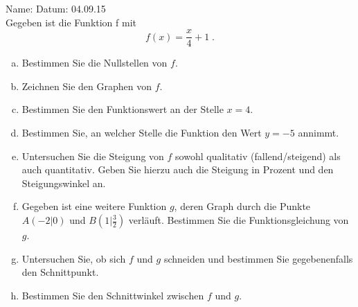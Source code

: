 \documentclass[12pt,fleqn]{article}
\theoremstyle{aufg}
\theoremstyle{bsp}
\begin{document}
 
    \begin{flushleft}
Name: \hspace{12cm} Datum: 04.09.15 \\[2em]Gegeben ist die Funktion f mit\[f(x)=\frac{x}{4} + 1\; . \]\begin{enumerate}[a)] 
\item 
Bestimmen Sie die Nullstellen von $f$. \\ 

\item 
Zeichnen Sie den Graphen von $f$. \\ 

\item 
Bestimmen Sie den Funktionswert an der Stelle $x=4$. \\ 

\item 
Bestimmen Sie, an welcher Stelle die Funktion den Wert $y=-5$ annimmt. \\ 

\item 
Untersuchen Sie die Steigung von $f$ sowohl qualitativ (fallend/steigend) als auch quantitativ. Geben Sie hierzu auch die Steigung in Prozent und den Steigungswinkel an. \\ 

\item 
Gegeben ist eine weitere Funktion $g$, deren Graph durch die Punkte $A(-2|0)$ und $B(1|\frac{3}{2})$ verl\"auft. Bestimmen Sie die Funktionsgleichung von $g$. \\ 

\item 
Untersuchen Sie, ob sich $f$ und $g$ schneiden und bestimmen Sie gegebenenfalls den Schnittpunkt. \\ 

\item 
Bestimmen Sie den Schnittwinkel zwischen $f$ und $g$. \\ 

\end{enumerate} 
\end{flushleft} 
    
\end{document}
